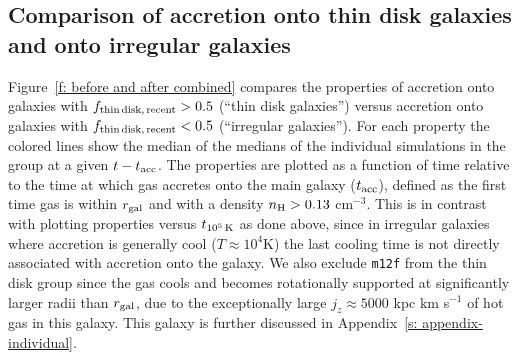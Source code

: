 \documentclass[fleqn,usenatbib]{mnras}
\newcommand{\fthin}{f_{\rm thin\,disk,\,recent}}
\newcommand{\tcools}{t_{10^5\,{\rm K}}}
\newcommand{\tacc}{t_{\rm acc}}
\begin{document}
\subsection{Comparison of accretion onto thin disk galaxies and onto irregular galaxies}

Figure~\ref{f: before and after combined} compares the properties of accretion onto galaxies with $\fthin > 0.5$ (``thin disk galaxies'') versus accretion onto galaxies with $\fthin < 0.5$ (``irregular galaxies'').
For each property the colored lines show the median of the medians of the individual simulations in the group at a given $t - \tacc$.
The properties are plotted as a function of time relative to the time at which gas accretes onto the main galaxy ($\tacc$), defined as the first time gas is within $r_{\rm gal}$ and with a density $n_{\rm H} > 0.13$ cm$^{-3}$.
This is in contrast with plotting properties versus $\tcools$ as done above, since in irregular galaxies where accretion is generally cool ($T\approx10^4$K) the last cooling time is not directly associated with accretion onto the galaxy. 
We also exclude \texttt{m12f} from the thin disk group since the gas cools and becomes rotationally supported at significantly larger radii than $r_{\rm gal}$, due to the exceptionally large $j_z\approx5000$ kpc km s$^{-1}$ of hot gas in this galaxy.
This galaxy is further discussed in Appendix~\ref{s: appendix-individual}. 
\end{document}
